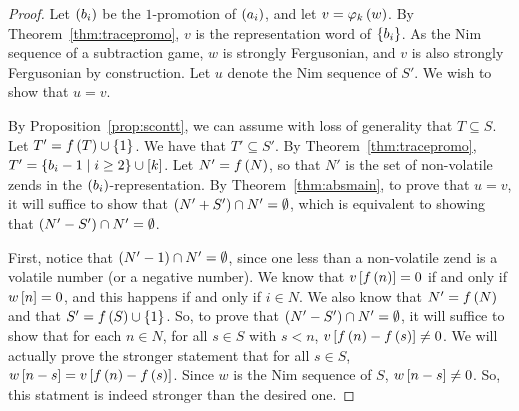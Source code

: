 \documentclass[english,12pt]{article}
\newcommand{\seq}{\p}
\begin{document}
\begin{proof}
Let $\seq{b_i}$ be the $1$-promotion of $\seq{a_i}$, and let $v=\varphi_k\left(w\right)$.  By Theorem~\ref{thm:tracepromo}, $v$ is the representation word of $\left\{b_i\right\}$.
As the Nim sequence of a subtraction game, $w$ is strongly Fergusonian, and $v$ is also strongly Fergusonian by construction.  Let $u$ denote the Nim sequence of $S'$.  We wish to show that $u=v$.

By Proposition~\ref{prop:scontt}, we can assume with loss of generality that $T\subseteq S$.  Let $T'=f\left(T\right)\cup\left\{1\right\}$.  We have that $T'\subseteq S'$.  By Theorem~\ref{thm:tracepromo}, $T'=\left\{b_i-1\mid i\geq2\right\}\cup\left[k\right]$.  Let $N'=f\left(N\right)$, so that $N'$ is the set of non-volatile zends in the $\seq{b_i}$-representation.  By Theorem~\ref{thm:absmain}, to prove that $u=v$, it will suffice to show that $\left(N'+S'\right)\cap N'=\emptyset$, which is equivalent to showing that $\left(N'-S'\right)\cap N'=\emptyset$.


First, notice that $\left(N'-1\right)\cap N'=\emptyset$, since one less than a non-volatile zend is a volatile number (or a negative number).
We know that $v\left[f\left(n\right)\right]=0$ if and only if $w\left[n\right]=0$, and this happens if and only if $i\in N$.  We also know that $N'=f\left(N\right)$ and that $S'=f\left(S\right)\cup\left\{1\right\}$.  So, to prove that $\left(N'-S'\right)\cap N'=\emptyset$, it will suffice to show that for each $n\in N$, for all $s\in S$ with $s<n$, $v\left[f\left(n\right)-f\left(s\right)\right]\neq 0$.
We will actually prove the stronger statement that for all $s\in S$, $w\left[n-s\right]=v\left[f\left(n\right)-f\left(s\right)\right]$.  Since $w$ is the Nim sequence of $S$, $w\left[n-s\right]\neq 0$.  So, this statment is indeed stronger than the desired one.


\end{proof}
\end{document}
